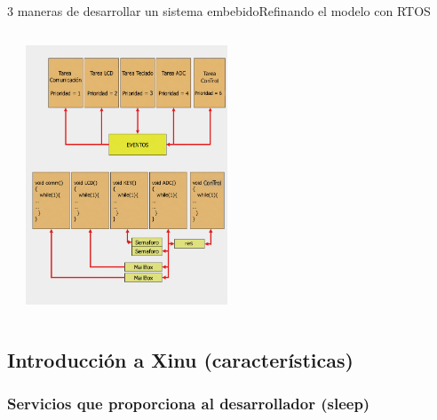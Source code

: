 \documentclass[8pt,aspectratio=169,compress]{beamer}
\begin{document}
\begin{frame}{3 maneras de desarrollar un sistema embebido}{Refinando el modelo con RTOS}
\begin{columns}[onlytextwidth,T]
\begin{itemize}
\end{itemize}

      \column{60mm}

     \includegraphics[width=60mm]{images/ejemplo-tareas2.jpg}
    \end{columns}
\end{frame}




\subsection{Introducción a Xinu (características)}
\subsubsection{Servicios que proporciona al desarrollador (sleep)}
\end{document}
